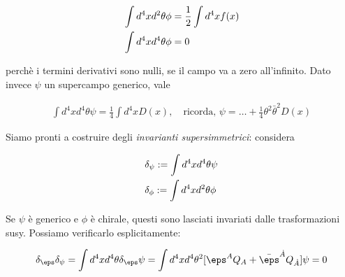 \documentclass{report}
\begin{document}
\begin{align}
    &\int d^4x d^2\theta \phi = \frac{1}{2}\int d^4x f(x) \notag \\
    &\int d^4x d^4\theta \phi = 0
\end{align}

perchè i termini derivativi sono nulli, se il campo va a zero all'infinito. Dato invece \(\psi\) un supercampo generico, vale 

\begin{align}
    \int d^4x d^4\theta \psi = \frac{1}{4}\int d^4x D(x), \quad \text{ricorda, } \psi = \ldots + \frac{1}{4}\theta^2\bar{\theta}^2 D(x)
\end{align}



Siamo pronti a costruire degli \emph{invarianti supersimmetrici}: considera 

\begin{align}
    &\delta_\psi := \int d^4x d^4 \theta \psi  \notag \\ 
    &\delta_\phi := \int d^4x d^2\theta \phi  
\end{align}

Se \(\psi\) è generico e \(\phi\) è chirale, questi sono lasciati invariati dalle trasformazioni susy. Possiamo verificarlo esplicitamente: 

\begin{align}
    \delta_\eps \delta_\psi = \int d^4x d^4\theta \delta_\eps \psi = \int d^4x d^4\theta^2 [\eps^A Q_A + \bar{\eps}^{\dot{A}}Q_{\dot{A}}]\psi = 0 
\end{align}
\end{document}
